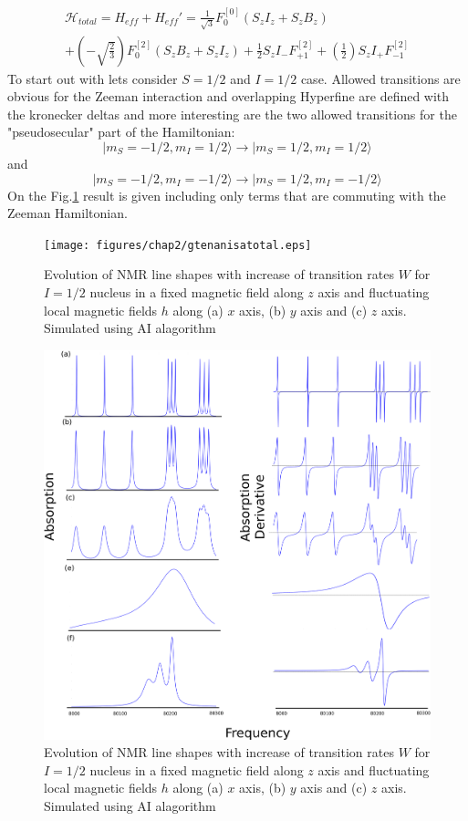\begin{multline}
\mathcal{H}_{total}=H_{eff}+H_{eff}'=\frac{1}{\sqrt{3}}F_{0}^{[0]}(S_zI_z+S_zB_z) \\ +(-\sqrt{\frac{2}{3}})F_{0}^{[2]}(S_zB_z+S_zI_z)+\frac{1}{2}S_zI_- F_{+1}^{[2]} +(\frac{1}{2})S_zI_+ F_{-1}^{[2]}
\end{multline}
To start out with lets consider $S=1/2$ and $I=1/2$ case. Allowed transitions are obvious for the Zeeman interaction and overlapping Hyperfine are defined with the kronecker deltas and more interesting are the two allowed transitions for the "pseudosecular" part of the Hamiltonian:
$$|m_S=-1/2,m_I=1/2\rangle\rightarrow|m_S=1/2,m_I=1/2\rangle$$ 
and 
$$|m_S=-1/2,m_I=-1/2\rangle\rightarrow|m_S=1/2,m_I=-1/2\rangle$$ 
On the Fig.\ref{figure:spin05} result is given including only terms that are commuting with the Zeeman Hamiltonian. 
\begin{figure}[h!]
\centering
\texttt{[image: figures/chap2/gtenanisatotal.eps]}
\caption{Evolution of NMR line shapes with increase of transition rates $W$ for $I=1/2$ nucleus in a fixed magnetic field along $z$ axis and fluctuating local magnetic fields $h$ along (a) $x$ axis, (b) $y$ axis and (c) $z$ axis. Simulated using AI alagorithm}
\label{figure:spin05}
\end{figure}
\begin{figure}[h!]
\centering
\includegraphics[width=1\textwidth]{figures/chap2/spinone.eps}
\caption{Evolution of NMR line shapes with increase of transition rates $W$ for $I=1/2$ nucleus in a fixed magnetic field along $z$ axis and fluctuating local magnetic fields $h$ along (a) $x$ axis, (b) $y$ axis and (c) $z$ axis. Simulated using AI alagorithm}
\label{figure:spin05der}
\end{figure}
\clearpage